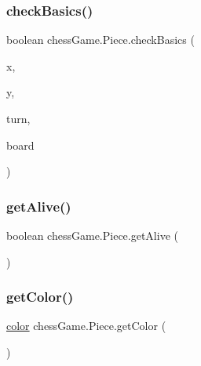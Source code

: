 \subsubsection{\texorpdfstring{check\+Basics()}{checkBasics()}}
{\footnotesize\ttfamily boolean chess\+Game.\+Piece.\+check\+Basics (\begin{DoxyParamCaption}\item[{int}]{x,  }\item[{int}]{y,  }\item[{int}]{turn,  }\item[{\hyperlink{classchess_game_1_1_chess_board}{Chess\+Board}}]{board }\end{DoxyParamCaption})}

\hypertarget{classchess_game_1_1_piece_a1710ae14c4a78b3b3853c00be581132c}{}\label{classchess_game_1_1_piece_a1710ae14c4a78b3b3853c00be581132c} 
\subsubsection{\texorpdfstring{get\+Alive()}{getAlive()}}
{\footnotesize\ttfamily boolean chess\+Game.\+Piece.\+get\+Alive (\begin{DoxyParamCaption}{ }\end{DoxyParamCaption})}

\hypertarget{classchess_game_1_1_piece_ad5b774ec1d029e20473344fe4669c589}{}\label{classchess_game_1_1_piece_ad5b774ec1d029e20473344fe4669c589} 
\subsubsection{\texorpdfstring{get\+Color()}{getColor()}}
{\footnotesize\ttfamily \hyperlink{classchess_game_1_1_piece_ad5117cbbbaebf3a27c4f3c2bcbd6678b}{color} chess\+Game.\+Piece.\+get\+Color (\begin{DoxyParamCaption}{ }\end{DoxyParamCaption})}

\hypertarget{classchess_game_1_1_piece_a057dfd4e48c07779e9d38b440785b2cc}{}\label{classchess_game_1_1_piece_a057dfd4e48c07779e9d38b440785b2cc} 
